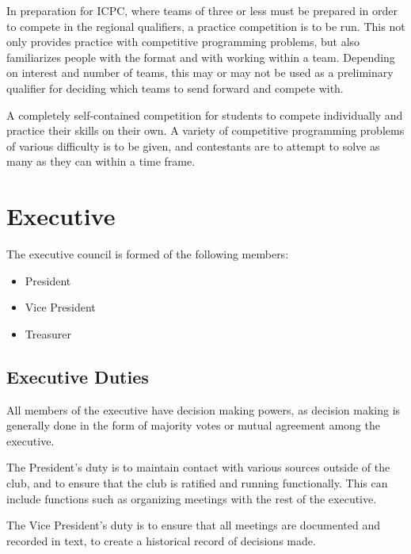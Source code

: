 \documentclass[11pt]{article}
\begin{document}
\vspace{2mm}
\noindent
In preparation for ICPC, where teams of three or less must be prepared in order to compete in the regional qualifiers, a practice competition is to be run. This not only provides practice with competitive programming problems, but also familiarizes people with the format and with working within a team. Depending on interest and number of teams, this may or may not be used as a preliminary qualifier for deciding which teams to send forward and compete with.

\vspace{2mm}
\noindent
A completely self-contained competition for students to compete individually and practice their skills on their own. A variety of competitive programming problems of various difficulty is to be given, and contestants are to attempt to solve as many as they can within a time frame.

\section{Executive}

The executive council is formed of the following members:

\begin{itemize}
  \item President
  \item Vice President
  \item Treasurer
\end{itemize}

\subsection{Executive Duties}

All members of the executive have decision making powers, as decision making is generally done in the form of majority votes or mutual agreement among the executive.

\vspace{2mm}
\noindent
The President's duty is to maintain contact with various sources outside of the club, and to ensure that the club is ratified and running functionally. This can include functions such as organizing meetings with the rest of the executive.

\vspace{2mm}
\noindent
The Vice President's duty is to ensure that all meetings are documented and recorded in text, to create a historical record of decisions made.
\end{document}
